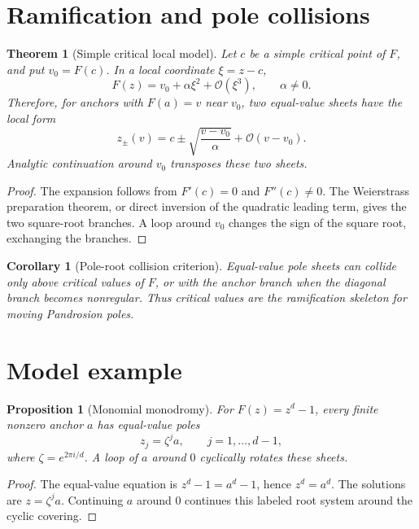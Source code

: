 \documentclass[11pt]{article}
\newtheorem{theorem}[definition]{Theorem}
\newtheorem{proposition}[definition]{Proposition}
\newtheorem{corollary}[definition]{Corollary}
\newcommand{\Oterm}{\mathcal O}
\begin{document}
\section{Ramification and pole collisions}

\begin{theorem}[Simple critical local model]\label{thm:ramification}
Let \(c\) be a simple critical point of \(F\), and put \(v_0=F(c)\). In a local coordinate \(\xi=z-c\),
\[
        F(z)=v_0+\alpha \xi^2+\Oterm(\xi^3),\qquad \alpha\ne0.
\]
Therefore, for anchors with \(F(a)=v\) near \(v_0\), two equal-value sheets have the local form
\[
        z_\pm(v)=c\pm \sqrt{\frac{v-v_0}{\alpha}}+\Oterm(v-v_0).
\]
Analytic continuation around \(v_0\) transposes these two sheets.
\end{theorem}

\begin{proof}
The expansion follows from \(F'(c)=0\) and \(F''(c)\ne0\). The Weierstrass preparation theorem, or direct inversion of the quadratic leading term, gives the two square-root branches. A loop around \(v_0\) changes the sign of the square root, exchanging the branches.
\end{proof}

\begin{corollary}[Pole-root collision criterion]\label{cor:collision}
Equal-value pole sheets can collide only above critical values of \(F\), or with the anchor branch when the diagonal branch becomes nonregular. Thus critical values are the ramification skeleton for moving Pandrosion poles.
\end{corollary}

\section{Model example}

\begin{proposition}[Monomial monodromy]\label{prop:monomial}
For \(F(z)=z^d-1\), every finite nonzero anchor \(a\) has equal-value poles
\[
        z_j=\zeta^j a,\qquad j=1,\ldots,d-1,
\]
where \(\zeta=e^{2\pi i/d}\). A loop of \(a\) around \(0\) cyclically rotates these sheets.
\end{proposition}

\begin{proof}
The equal-value equation is \(z^d-1=a^d-1\), hence \(z^d=a^d\). The solutions are \(z=\zeta^j a\). Continuing \(a\) around \(0\) continues this labeled root system around the cyclic covering.
\end{proof}
\end{document}
